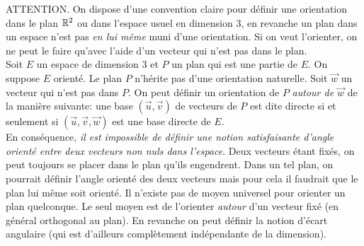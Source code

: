 ATTENTION. On dispose d'une convention claire pour définir une orientation dans le plan $\mathbb{R}^2$ ou dans l'espace usuel en dimension 3, en revanche un plan dans un espace n'est pas \emph{en lui même} muni d'une orientation. Si on veut l'orienter, on ne peut le faire qu'avec l'aide d'un vecteur qui n'est pas dans le plan.\\
Soit $E$ un espace de dimension $3$ et $P$ un plan qui est une partie de $E$. On suppose $E$ orienté. Le plan $P$ n'hérite pas d'une orientation naturelle. Soit $\overrightarrow w$ un vecteur qui n'est pas dans $P$. On peut définir un orientation de $P$ \emph{autour de $\overrightarrow w$} de la manière suivante: une base $(\overrightarrow u , \overrightarrow v)$ de vecteurs de $P$ est dite directe si et seulement si $(\overrightarrow u , \overrightarrow v , \overrightarrow w)$ est une base directe de $E$.\\
En conséquence, \emph{il est impossible de définir une notion satisfaisante d'angle orienté entre deux vecteurs non nuls dans l'espace}. Deux vecteurs étant fixés, on peut toujours se placer dans le plan qu'ils engendrent. Dans un tel plan, on pourrait définir l'angle orienté des deux vecteurs mais pour cela il faudrait que le plan lui même soit orienté. Il n'existe pas de moyen universel pour orienter un plan quelconque. Le seul moyen est de l'orienter \emph{autour} d'un vecteur fixé (en général orthogonal au plan). En revanche on peut définir la notion d'écart angulaire (qui est d'ailleurs complètement indépendante de la dimension).
 
